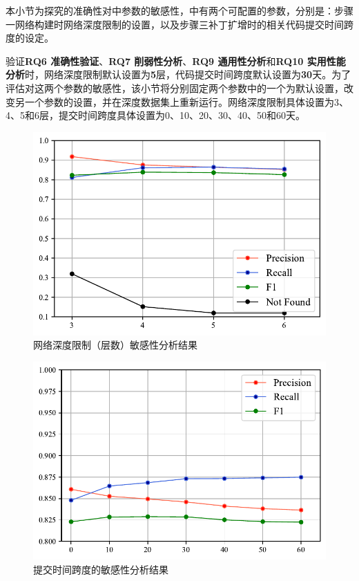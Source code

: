 本小节为探究\tool 的准确性对\tool 中参数的敏感性，\tool 中有两个可配置的参数，分别是：\tool 步骤一网络构建时网络深度限制的设置，以及步骤三补丁扩增时的相关代码提交时间跨度的设定。

验证\textbf{RQ6 准确性验证}、\textbf{RQ7 削弱性分析}、\textbf{RQ9 通用性分析}和\textbf{RQ10 实用性能分析}时，网络深度限制默认设置为\textbf{5}层，代码提交时间跨度默认设置为\textbf{30}天。为了评估\tool 对这两个参数的敏感性，该小节将分别固定两个参数中的一个为默认设置，改变另一个参数的设置，并在深度数据集上重新运行\tool 。网络深度限制具体设置为3、4、5和6层，提交时间跨度具体设置为0、10、20、30、40、50和60天。
\begin{figure}[h]
    \centering
    \includegraphics[scale=1.0]{res/rq8-sensitivity-depth.pdf}
    \caption{网络深度限制（层数）敏感性分析结果}\label{fig:depth}
\end{figure}

\begin{figure}[h]
    \centering
    \includegraphics[scale=1.0]{res/rq8-sensitivity-span.pdf}
    \caption{提交时间跨度的敏感性分析结果}\label{fig:span}
\end{figure}


